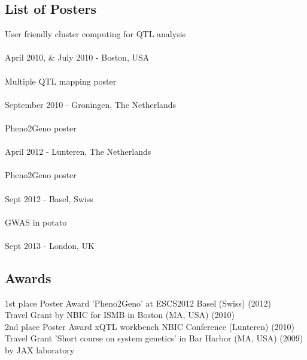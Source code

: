 \subsection{List of Posters}
User friendly cluster computing for QTL analysis\\
  \\
   April 2010, \&  July 2010 - Boston, USA\\\\
Multiple QTL mapping poster\\
  \\
   September 2010 - Groningen, The Netherlands\\\\
Pheno2Geno poster\\
  \\
   April 2012 - Lunteren, The Netherlands\\\\
Pheno2Geno poster\\
  \\
   Sept 2012 - Basel, Swiss\\\\
GWAS in potato\\
  \\
   Sept 2013 - London, UK

\subsection{Awards}
1st place Poster Award 'Pheno2Geno' at ESCS2012 Basel (Swiss) (2012)\\
Travel Grant by NBIC for ISMB in Boston (MA, USA) (2010)\\
2nd place Poster Award xQTL workbench NBIC Conference (Lunteren) (2010)\\
Travel Grant 'Short course on system genetics' in Bar Harbor (MA, USA) (2009) by JAX laboratory\\
